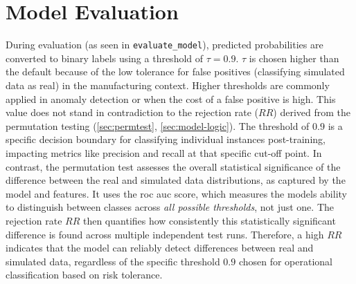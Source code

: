 \section{Model Evaluation}

During evaluation (as seen in \texttt{evaluate\_model}), predicted probabilities are converted to binary labels using a threshold of $\tau = 0.9$. $\tau$ is chosen higher than the default because of the low tolerance for false positives (classifying simulated data as real) in the manufacturing context. Higher thresholds are commonly applied in anomaly detection or when the cost of a false positive is high. This value does not stand in contradiction to the rejection rate ($RR$) derived from the permutation testing (\autoref{sec:permtest}, \autoref{sec:model-logic}). The threshold of $0.9$ is a specific decision boundary for classifying individual instances post-training, impacting metrics like precision and recall at that specific cut-off point. In contrast, the permutation test assesses the overall statistical significance of the difference between the real and simulated data distributions, as captured by the model and features. It uses the \gls{roc} \gls{auc} score, which measures the models ability to distinguish between classes across \textit{all possible thresholds}, not just one. The rejection rate $RR$ then quantifies how consistently this statistically significant difference is found across multiple independent test runs. Therefore, a high $RR$ indicates that the model can reliably detect differences between real and simulated data, regardless of the specific threshold $0.9$ chosen for operational classification based on risk tolerance.
